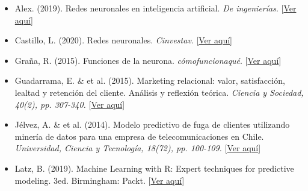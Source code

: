 \documentclass{report}
\begin{document}
%

\begin{itemize}
\item Alex. (2019). Redes neuronales en inteligencia artificial. \textit{De ingenierías}. 
[\textcolor{blue}{\href{https://deingenierias.com/inteligencia-artificial/redes-neuronales-en-inteligencia-artificial/}{Ver aquí}}]
\vspace{0.4cm}

\item Castillo, L. (2020). Redes neuronales.\textit{ Cinvestav}. 
[\textcolor{blue}{\href{https://rstudio-pubs-static.s3.amazonaws.com/599210_4306c5d3d6a34a6c829566ca11b7e27a.html#1}{Ver aquí}}]
\vspace{0.4cm}

\item Graña, R. (2015). Funciones de la neurona. \textit{cómofuncionaqué}.
[\textcolor{blue}{\href{https://comofuncionaque.com/funciones-de-la-neurona/}{Ver aquí}}]
\vspace{0.4cm}

\item Guadarrama, E. \& et al. (2015). Marketing relacional: valor, satisfacción, lealtad y retención del cliente. Análisis y reflexión teórica.\textit{ Ciencia y Sociedad, 40(2), pp. 307-340.}
[\textcolor{blue}{\href{https://www.redalyc.org/pdf/870/87041161004.pdf}{Ver aquí}}]
\vspace{0.4cm}

\item Jélvez, A. \& et al. (2014). Modelo predictivo de fuga de clientes utilizando minería de datos para una empresa de telecomunicaciones en Chile. \textit{Universidad, Ciencia y Tecnología, 18(72), pp. 100-109.}
[\textcolor{blue}{\href{http://ve.scielo.org/scielo.php?script=sci_arttext&pid=S1316-48212014000300004}{Ver aquí}}]
\vspace{0.4cm}

\item Latz, B. (2019). Machine Learning with R: Expert techniques for predictive modeling. 3ed. Birmingham: Packt.
[\textcolor{blue}{\href{https://www.amazon.com/-/es/Brett-Lantz/dp/1788295862}{Ver aquí}}]
\vspace{0.4cm}

\end{itemize}
\end{document}
